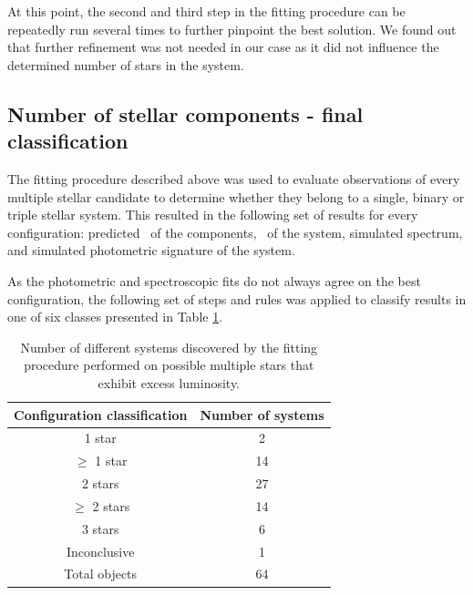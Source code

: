 At this point, the second and third step in the fitting procedure can be repeatedly run several times to further pinpoint the best solution. We found out that further refinement was not needed in our case as it did not influence the determined number of stars in the system.


\subsection{Number of stellar components - final classification}
\label{sec:number_stars_tripple}
The fitting procedure described above was used to evaluate observations of every multiple stellar candidate to determine whether they belong to a single, binary or triple stellar system. This resulted in the following set of results for every configuration: predicted \Teff\ of the components, \Feh\ of the system, simulated spectrum, and simulated photometric signature of the system.

As the photometric and spectroscopic fits do not always agree on the best configuration, the following set of steps and rules was applied to classify results in one of six classes presented in Table \ref{tab:res_multiples}.

\begin{table}
	\centering
	\caption{Number of different systems discovered by the fitting procedure performed on possible multiple stars that exhibit excess luminosity.}
	\begin{tabular}{c c}
		\hline
		Configuration classification & Number of systems \\ 
		\hline
		1 star & 2 \\
		$\geq$ 1 star & 14 \\
		2 stars & 27 \\
		$\geq$ 2 stars & 14 \\
		3 stars & 6 \\
		Inconclusive & 1 \\
		\hline
		Total objects & 64 \\
		\hline
	\end{tabular}
	\label{tab:res_multiples}
\end{table}


